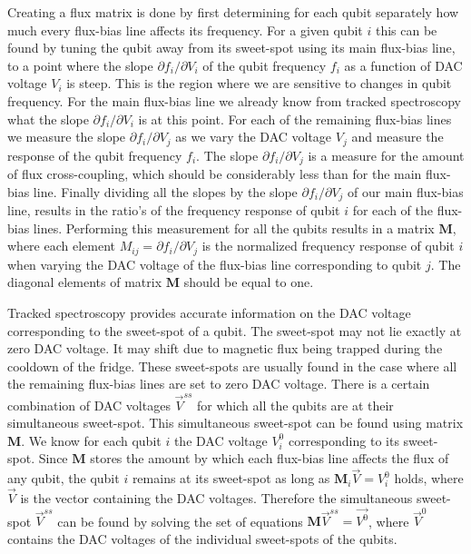 \documentclass[12pt]{report}
\begin{document}
        Creating a flux matrix is done by first determining for each qubit separately how much every flux-bias line affects its frequency. For a given qubit $i$ this can be found by tuning the qubit away from its sweet-spot using its main flux-bias line, to a point where the slope $\partial f_i/\partial V_i$ of the qubit frequency $f_i$ as a function of DAC voltage $V_i$ is steep. This is the region where we are sensitive to changes in qubit frequency. For the main flux-bias line we already know from tracked spectroscopy what the slope $\partial f_i / \partial V_i$ is at this point. For each of the remaining flux-bias lines we measure the slope $\partial f_i / \partial V_j$ as we vary the DAC voltage $V_j$ and measure the response of the qubit frequency $f_i$. The slope $\partial f_i / \partial V_j$ is a measure for the amount of flux cross-coupling, which should be considerably less than for the main flux-bias line. Finally dividing all the slopes by the slope $\partial f_i / \partial V_j$ of our main flux-bias line, results in the ratio's of the frequency response of qubit $i$ for each of the flux-bias lines. Performing this measurement for all the qubits results in a matrix $\boldsymbol{M}$, where each element $M_{ij}=\partial f_i / \partial V_j$ is the normalized frequency response of qubit $i$ when varying the DAC voltage of the flux-bias line corresponding to qubit $j$. The diagonal elements of matrix $\boldsymbol{M}$ should be equal to one.

        Tracked spectroscopy provides accurate information on the DAC voltage corresponding to the sweet-spot of a qubit. The sweet-spot may not lie exactly at zero DAC voltage. It may shift due to magnetic flux being trapped during the cooldown of the fridge. These sweet-spots are usually found in the case where all the remaining flux-bias lines are set to zero DAC voltage. There is a certain combination of DAC voltages $\vec{V}^{ss}$ for which all the qubits are at their simultaneous sweet-spot. This simultaneous sweet-spot can be found using matrix $\boldsymbol{M}$. We know for each qubit $i$ the DAC voltage $V^0_i$ corresponding to its sweet-spot. Since $\boldsymbol{M}$ stores the amount by which each flux-bias line affects the flux of any qubit, the qubit $i$ remains at its sweet-spot as long as $\boldsymbol{M}_i \vec{V}=V^0_i$ holds, where $\vec{V}$ is the vector containing the DAC voltages. Therefore the simultaneous sweet-spot $\vec{V}^{ss}$ can be found by solving the set of equations $\boldsymbol{M} \vec{V}^{ss} = \vec{V^0}$, where $\vec{V}^0$ contains the DAC voltages of the individual sweet-spots of the qubits.
\end{document}
